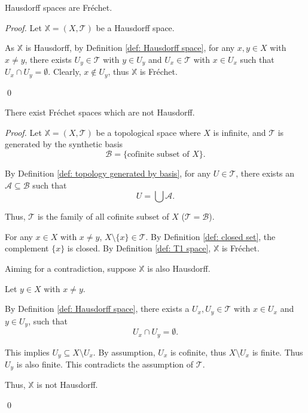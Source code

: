 \begin{proposition}
	Hausdorff spaces are Fr\'echet.
	
	\begin{proof}
		Let $\mathbb X = (X, \mathcal T)$ be a Hausdorff space.
		
		As $\mathbb X$ is Hausdorff, by Definition \ref{def: Hausdorff space}, for any $x,y \in X$ with $x \ne y$, there exists $U_y \in \mathcal T$ with $y \in U_y$ and $U_x \in \mathcal T$ with $x \in U_x$ such that $U_x \cap U_y = \emptyset$. Clearly, $x \notin U_y$, thus $\mathbb X$ is Fr\'echet.
		
		\qed
	\end{proof}
\end{proposition}


\begin{proposition}
	There exist Fr\'echet spaces which are not Hausdorff.
	
	\begin{proof}
		Let $\mathbb X = (X, \mathcal T)$ be a topological space where $X$ is infinite, and $\mathcal T$ is generated by the synthetic basis
		$$
		\mathcal B = \{ \text{cofinite subset of $X$} \}.
		$$
		
		By Definition \ref{def: topology generated by basis}, for any $U \in \mathcal T$, there exists an $\mathcal A \subseteq \mathcal B$ such that
		$$
		U = \bigcup \mathcal A.
		$$
		
		Thus, $\mathcal T$ is the family of all cofinite subset of $X$ ($\mathcal T = \mathcal B$).
		
		For any $x \in X$ with $x \ne y$, $X \setminus \{x\} \in \mathcal T$. By Definition \ref{def: closed set}, the complement $\{x\}$ is closed. By Definition \ref{def: T1 space}, $\mathbb X$ is Fr\'echet.
		
		Aiming for a contradiction, suppose $\mathbb X$ is also Hausdorff.
		
		Let $y \in X$ with $x \ne y$.
		
		By Definition \ref{def: Hausdorff space}, there exists a $U_x,U_y \in \mathcal T$ with $x \in U_x$ and $y \in U_y$, such that
		$$
		U_x \cap U_y = \emptyset.
		$$
		
		This implies $U_y \subseteq X \setminus U_x$. By assumption, $U_x$ is cofinite, thus $X \setminus U_x$ is finite. Thus $U_y$ is also finite. This contradicts the assumption of $\mathcal T$.
		
		Thus, $\mathbb X$ is not Hausdorff.
		
		\qed
	\end{proof}
\end{proposition}



